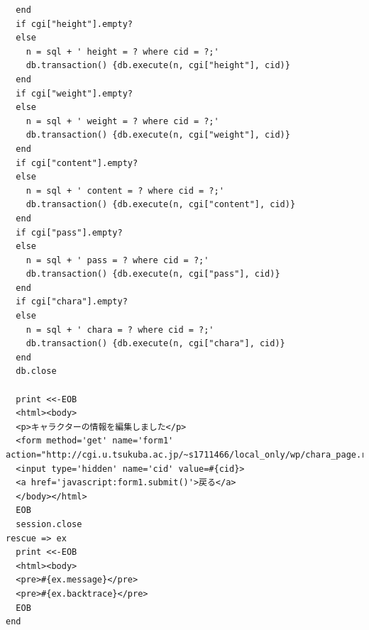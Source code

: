 \documentclass[12pt,a4paper]{jarticle}
\begin{document}
\begin{ttfamily}
\begin{oframed}
\begin{verbatim}
  end
  if cgi["height"].empty?
  else
    n = sql + ' height = ? where cid = ?;'
    db.transaction() {db.execute(n, cgi["height"], cid)}
  end
  if cgi["weight"].empty?
  else
    n = sql + ' weight = ? where cid = ?;'
    db.transaction() {db.execute(n, cgi["weight"], cid)}
  end
  if cgi["content"].empty?
  else
    n = sql + ' content = ? where cid = ?;'
    db.transaction() {db.execute(n, cgi["content"], cid)}
  end
  if cgi["pass"].empty?
  else
    n = sql + ' pass = ? where cid = ?;'
    db.transaction() {db.execute(n, cgi["pass"], cid)}
  end
  if cgi["chara"].empty?
  else
    n = sql + ' chara = ? where cid = ?;'
    db.transaction() {db.execute(n, cgi["chara"], cid)}
  end
  db.close

  print <<-EOB
  <html><body>
  <p>キャラクターの情報を編集しました</p>
  <form method='get' name='form1' action="http://cgi.u.tsukuba.ac.jp/~s1711466/local_only/wp/chara_page.rb">
  <input type='hidden' name='cid' value=#{cid}>
  <a href='javascript:form1.submit()'>戻る</a>
  </body></html>
  EOB
  session.close
rescue => ex
  print <<-EOB
  <html><body>
  <pre>#{ex.message}</pre>
  <pre>#{ex.backtrace}</pre>
  EOB
end
 \end{verbatim}
\end{oframed}

\end{ttfamily}
\end{document}
